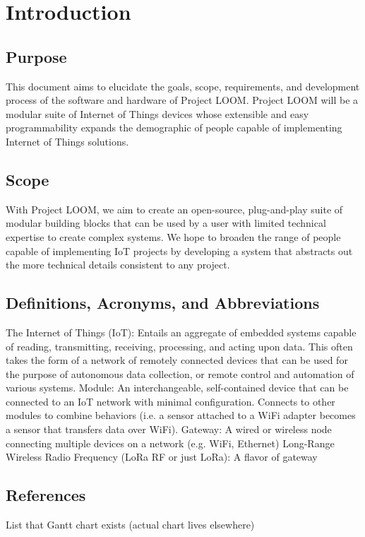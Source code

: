 \documentclass[onecolumn, draftclsnofoot,10pt, compsoc]{IEEEtran}
\begin{document}
\newpage
{}
\tableofcontents
\clearpage

\section{Introduction}
	\subsection{Purpose}
	This document aims to elucidate the goals, scope, requirements, and development process of the software and hardware of Project LOOM. Project LOOM will be a modular suite of Internet of Things devices whose extensible and easy programmability expands the demographic of people capable of implementing Internet of Things solutions.
	\subsection{Scope}
	With Project LOOM, we aim to create an open-source, plug-and-play suite of modular building blocks that can be used by a user with limited technical expertise to create complex systems. We hope to broaden the range of people capable of implementing IoT projects by developing a system that abstracts out the more technical details consistent to any project.
	\subsection{Definitions, Acronyms, and Abbreviations}
	The Internet of Things (IoT): 
	Entails an aggregate of embedded systems capable of reading, transmitting, receiving, processing, and acting upon data. This often takes the form of a network of remotely connected devices that can be used for the purpose of autonomous data collection, or remote control and automation of various systems. 
	Module:
	An interchangeable, self-contained device that can be connected to an IoT network with minimal configuration. Connects to other modules to combine behaviors (i.e. a sensor attached to a WiFi adapter becomes a sensor that transfers data over WiFi).
	Gateway:
	A wired or wireless node connecting multiple devices on a network (e.g. WiFi, Ethernet)
	Long-Range Wireless Radio Frequency (LoRa RF or just LoRa):
	A flavor of gateway 

	\subsection{References}
	List that Gantt chart exists (actual chart lives elsewhere)
\end{document}
